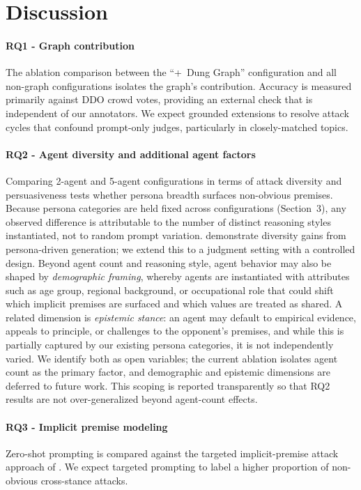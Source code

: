 \documentclass[11pt,twocolumn,letterpaper]{article}
\begin{document}
\section{Discussion}
\label{sec:discussion}

\paragraph{RQ1 - Graph contribution}
The ablation comparison between the ``+~Dung Graph'' configuration and all
non-graph configurations isolates the graph's contribution. Accuracy is
measured primarily against DDO crowd votes, providing an external check
that is independent of our annotators. We expect grounded extensions to
resolve attack cycles that confound prompt-only judges, particularly in
closely-matched topics.

\paragraph{RQ2 - Agent diversity and additional agent factors}
Comparing 2-agent and 5-agent configurations in terms of attack diversity
and persuasiveness tests whether persona breadth surfaces non-obvious
premises. Because persona categories are held fixed across configurations
(Section~3), any observed difference is attributable to the number of
distinct reasoning styles instantiated, not to random prompt variation.
\citet{hu2025debate2write} demonstrate diversity gains from persona-driven
generation; we extend this to a judgment setting with a controlled design.
Beyond agent count and reasoning style, agent behavior may also be shaped
by \emph{demographic framing}, whereby agents are instantiated with
attributes such as age group, regional background, or occupational role
that could shift which implicit premises are surfaced and which values are
treated as shared. A related dimension is \emph{epistemic stance}: an
agent may default to empirical evidence, appeals to principle, or
challenges to the opponent's premises, and while this is partially
captured by our existing persona categories, it is not independently
varied. We identify both as open variables; the current
ablation isolates agent count as the primary factor, and demographic and
epistemic dimensions are deferred to future work. This scoping is reported
transparently so that RQ2 results are not over-generalized beyond
agent-count effects.

\paragraph{RQ3 - Implicit premise modeling}
Zero-shot prompting is compared against the targeted implicit-premise attack
approach of \citet{ozaki2025llmdebate}. We expect targeted prompting to
label a higher proportion of non-obvious cross-stance attacks.
\end{document}
